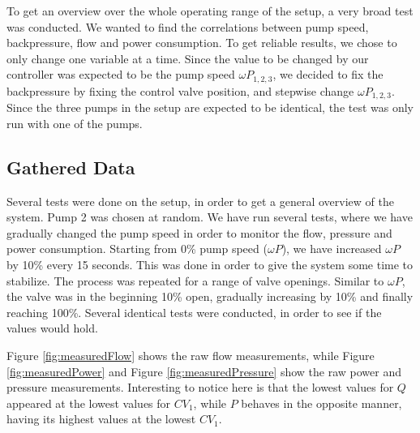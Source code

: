 To get an overview over the whole operating range of the setup,
a very broad test was conducted.
We wanted to find the correlations between pump speed, backpressure, flow and power consumption.
To get reliable results, we chose to only change one variable at a time.
Since the value to be changed by our controller was expected to be the pump speed $\omega P_{1,2,3}$,
we decided to fix the backpressure by fixing the control valve position,
and stepwise change $\omega P_{1,2,3}$.
Since the three pumps in the setup are expected to be identical,
the test was only run with one of the pumps.


\subsection{Gathered Data}
Several tests were done on the setup, in order to get a general overview of the system.
Pump 2 was chosen at random.
We have run several tests, where we have gradually changed the pump speed in order to monitor
the flow, pressure and power consumption.
Starting from 0\% pump speed ($\omega P$), we have increased $\omega P$ by 10\% every 15 seconds.
This was done in order to give the system some time to stabilize.
The process was repeated for a range of valve openings.
Similar to $\omega P$, the valve was in the beginning 10\% open,
gradually increasing by 10\% and finally reaching 100\%.
Several identical tests were conducted, in order to see if the values would hold.

Figure \ref{fig:measuredFlow} shows the raw flow measurements,
while Figure \ref{fig:measuredPower} and Figure \ref{fig:measuredPressure} show the
raw power and pressure measurements.
Interesting to notice here is that the lowest values for $Q$ appeared at the lowest values for $CV_1$,
while $P$ behaves in the opposite manner, having its highest values at the lowest $CV_1$.
%
%

